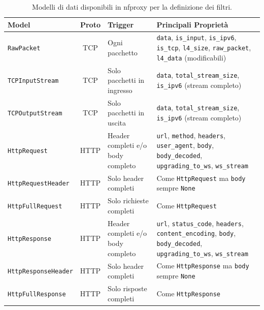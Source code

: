 \renewcommand{\arraystretch}{1.3}
\begin{table}[H]
    \centering
    \footnotesize
    \begin{tabular}{|l|c|p{3.5cm}|p{6cm}|}
        \hline
        \textbf{Model} & \textbf{Proto} & \textbf{Trigger} & \textbf{Principali Proprietà} \\
        \hline
        \texttt{RawPacket} & TCP & Ogni pacchetto &
        \texttt{data}, \texttt{is\_input}, \texttt{is\_ipv6}, \texttt{is\_tcp}, \texttt{l4\_size}, \texttt{raw\_packet}, \texttt{l4\_data} (modificabili) \\
        \hline
        \texttt{TCPInputStream} & TCP & Solo pacchetti in ingresso &
        \texttt{data}, \texttt{total\_stream\_size}, \texttt{is\_ipv6} (stream completo) \\
        \hline
        \texttt{TCPOutputStream} & TCP & Solo pacchetti in uscita &
        \texttt{data}, \texttt{total\_stream\_size}, \texttt{is\_ipv6} (stream completo) \\
        \hline
        \texttt{HttpRequest} & HTTP & Header completi e/o body completo &
        \texttt{url}, \texttt{method}, \texttt{headers}, \texttt{user\_agent}, \texttt{body}, \texttt{body\_decoded}, \texttt{upgrading\_to\_ws}, \texttt{ws\_stream} \\
        \hline
        \texttt{HttpRequestHeader} & HTTP & Solo header completi &
        Come \texttt{HttpRequest} ma \texttt{body} sempre \texttt{None} \\
        \hline
        \texttt{HttpFullRequest} & HTTP & Solo richieste completi &
        Come \texttt{HttpRequest}\\
        \hline
        \texttt{HttpResponse} & HTTP & Header completi e/o body completo &
        \texttt{url}, \texttt{status\_code}, \texttt{headers}, \texttt{content\_encoding}, \texttt{body}, \texttt{body\_decoded}, \texttt{upgrading\_to\_ws}, \texttt{ws\_stream} \\
        \hline
        \texttt{HttpResponseHeader} & HTTP & Solo header completi &
        Come \texttt{HttpResponse} ma \texttt{body} sempre \texttt{None} \\
        \hline
        \texttt{HttpFullResponse} & HTTP & Solo risposte completi &
        Come \texttt{HttpResponse}\\
        \hline
    \end{tabular}
    \caption{Modelli di dati disponibili in nfproxy per la definizione dei filtri.}\label{tab:nfproxy_datahandlers}
\end{table}
\renewcommand{\arraystretch}{1}

